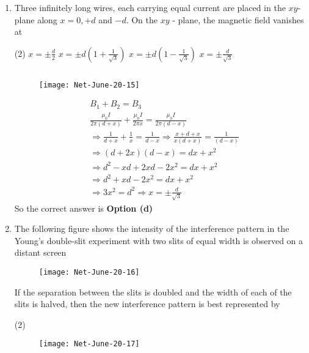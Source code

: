 \begin{enumerate}
\begin{answer}
\end{answer}
\item Three infinitely long wires, each carrying equal current are placed in the $x y$-plane along $x=0,+d$ and $-d$. On the $x y$ - plane, the magnetic field vanishes at
 \begin{tasks}(2)
	\task[\textbf{a.}]$x=\pm \frac{d}{2}$
	\task[\textbf{b.}]$x=\pm d\left(1+\frac{1}{\sqrt{3}}\right)$
	\task[\textbf{c.}] $x=\pm d\left(1-\frac{1}{\sqrt{3}}\right)$
	\task[\textbf{d.}] $x=\pm \frac{d}{\sqrt{3}}$
\end{tasks}	
\begin{answer}$\left. \right. $
		\begin{figure}[H]
		\centering
		\texttt{[image: Net-June-20-15]}
	\end{figure}
	\begin{align*}
	&B_{1}+B_{2}=B_{3}\\
	&\frac{\mu_{0} I}{2 \pi(d+x)}+\frac{\mu_{0} I}{2 \pi x}=\frac{\mu_{0} I}{2 \pi(d-x)} \\
	&\Rightarrow \frac{1}{d+x}+\frac{1}{x}=\frac{1}{d-x} \Rightarrow \frac{x+d+x}{x(d+x)}=\frac{1}{(d-x)} \\
	&\Rightarrow(d+2 x)(d-x)=d x+x^{2} \\
	&\Rightarrow d^{2}-x d+2 x d-2 x^{2}=d x+x^{2} \\
	&\Rightarrow d^{2}+x d-2 x^{2}=d x+x^{2} \\
	&\Rightarrow 3 x^{2}=d^{2} \Rightarrow x=\pm \frac{d}{\sqrt{3}}
	\end{align*}
	So the correct answer is \textbf{Option (d)}
\end{answer}
\item The following figure shows the intensity of the interference pattern in the Young's double-slit experiment with two slits of equal width is observed on a distant screen	
	\begin{figure}[H]
	\centering
	\texttt{[image: Net-June-20-16]}
\end{figure}
If the separation between the slits is doubled and the width of each of the slits is halved, then the new interference pattern is best represented by 
\begin{tasks}(2)
	\task[\textbf{a.}]
		\begin{figure}[H]
		\centering
		\texttt{[image: Net-June-20-17]}
	\end{figure}
	\task[\textbf{b.}]
		\begin{figure}[H]

\end{figure}
\end{tasks}
\end{enumerate}
